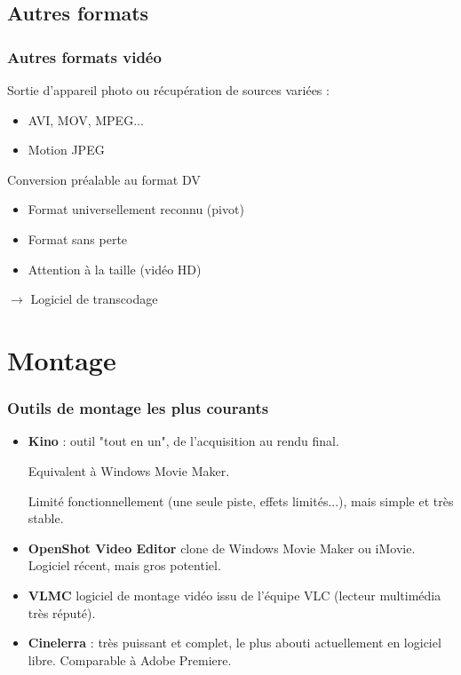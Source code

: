  \subsection{Autres formats}
 \begin{frame}
 \frametitle{Autres formats vidéo}
Sortie d'appareil photo ou récupération de sources variées :
  \begin{itemize}
 \item AVI, MOV, MPEG...
 \item Motion JPEG
 \end{itemize}
 Conversion préalable au format DV
   \begin{itemize}
 \item Format universellement reconnu (pivot)
 \item Format sans perte
 \item Attention à la taille (vidéo HD)
 \end{itemize}
 $\rightarrow$ Logiciel de transcodage
 \end{frame}

\section{Montage}
\begin{frame}
 \frametitle{Outils de montage les plus courants}
 \begin{itemize}
 \item \textbf{Kino} : outil "tout en un", de l'acquisition au rendu final.
 
 Equivalent à Windows Movie Maker.
 
 Limité fonctionnellement (une seule piste, effets limités...), mais simple et très stable.
 
 \item \textbf{OpenShot Video Editor} clone de Windows Movie Maker ou iMovie. Logiciel récent, mais gros potentiel.
 
 \item \textbf{VLMC} logiciel de montage vidéo issu de l'équipe VLC (lecteur multimédia très réputé).
 
 \item \textbf{Cinelerra} : très puissant et complet, le plus abouti actuellement en logiciel libre. Comparable à Adobe Premiere.
 \end{itemize}

\end{frame}

